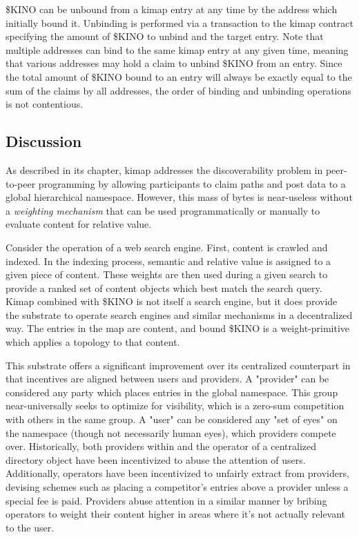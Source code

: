 \documentclass[runningheads]{llncs}
\begin{document}
\$KINO can be unbound from a kimap entry at any time by the address which initially bound it.
Unbinding is performed via a transaction to the kimap contract specifying the amount of \$KINO to unbind and the target entry.
Note that multiple addresses can bind to the same kimap entry at any given time, meaning that various addresses may hold a claim to unbind \$KINO from an entry. Since the total amount of \$KINO bound to an entry will always be exactly equal to the sum of the claims by all addresses, the order of binding and unbinding operations is not contentious.

\subsection{Discussion}

As described in its chapter, kimap addresses the discoverability problem in peer-to-peer programming by allowing participants to claim paths and post data to a global hierarchical namespace.
However, this mass of bytes is near-useless without a \textit{weighting mechanism} that can be used programmatically or manually to evaluate content for relative value.

Consider the operation of a web search engine.
First, content is crawled and indexed.
In the indexing process, semantic and relative value is assigned to a given piece of content.
These weights are then used during a given search to provide a ranked set of content objects which best match the search query.
Kimap combined with \$KINO is not itself a search engine, but it does provide the substrate to operate search engines and similar mechanisms in a decentralized way.
The entries in the map are content, and bound \$KINO is a weight-primitive which applies a topology to that content.

This substrate offers a significant improvement over its centralized counterpart in that incentives are aligned between users and providers.
A "provider" can be considered any party which places entries in the global namespace.
This group near-universally seeks to optimize for visibility, which is a zero-sum competition with others in the same group.
A "user" can be considered any "set of eyes" on the namespace (though not necessarily human eyes), which providers compete over.
Historically, both providers within and the operator of a centralized directory object have been incentivized to abuse the attention of users.
Additionally, operators have been incentivized to unfairly extract from providers, devising schemes such as placing a competitor's entries above a provider unless a special fee is paid.
Providers abuse attention in a similar manner by bribing operators to weight their content higher in areas where it's not actually relevant to the user.
\end{document}

